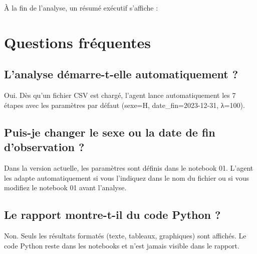 \documentclass[11pt,a4paper]{article}
\begin{document}
À la fin de l'analyse, un résumé exécutif s'affiche :

\begin{center}
\end{center}

\section{Questions fréquentes}

\subsection{L'analyse démarre-t-elle automatiquement ?}
Oui. Dès qu'un fichier CSV est chargé, l'agent lance automatiquement les 7 étapes
avec les paramètres par défaut (sexe=H, date\_fin=2023-12-31, λ=100).

\subsection{Puis-je changer le sexe ou la date de fin d'observation ?}
Dans la version actuelle, les paramètres sont définis dans le notebook 01.
L'agent les adapte automatiquement si vous l'indiquez dans le nom du fichier
ou si vous modifiez le notebook 01 avant l'analyse.

\subsection{Le rapport montre-t-il du code Python ?}
Non. Seuls les résultats formatés (texte, tableaux, graphiques) sont affichés.
Le code Python reste dans les notebooks et n'est jamais visible dans le rapport.
\end{document}
